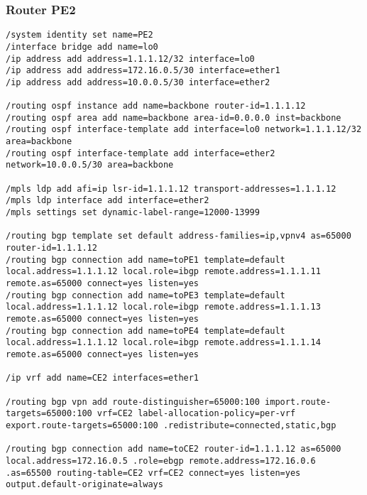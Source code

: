 \subsubsection*{Router PE2}
\begin{lstlisting}[language=RouterOS]
/system identity set name=PE2
/interface bridge add name=lo0
/ip address add address=1.1.1.12/32 interface=lo0
/ip address add address=172.16.0.5/30 interface=ether1
/ip address add address=10.0.0.5/30 interface=ether2

/routing ospf instance add name=backbone router-id=1.1.1.12
/routing ospf area add name=backbone area-id=0.0.0.0 inst=backbone
/routing ospf interface-template add interface=lo0 network=1.1.1.12/32 area=backbone
/routing ospf interface-template add interface=ether2 network=10.0.0.5/30 area=backbone

/mpls ldp add afi=ip lsr-id=1.1.1.12 transport-addresses=1.1.1.12
/mpls ldp interface add interface=ether2
/mpls settings set dynamic-label-range=12000-13999

/routing bgp template set default address-families=ip,vpnv4 as=65000 router-id=1.1.1.12
/routing bgp connection add name=toPE1 template=default local.address=1.1.1.12 local.role=ibgp remote.address=1.1.1.11 remote.as=65000 connect=yes listen=yes
/routing bgp connection add name=toPE3 template=default local.address=1.1.1.12 local.role=ibgp remote.address=1.1.1.13 remote.as=65000 connect=yes listen=yes
/routing bgp connection add name=toPE4 template=default local.address=1.1.1.12 local.role=ibgp remote.address=1.1.1.14 remote.as=65000 connect=yes listen=yes

/ip vrf add name=CE2 interfaces=ether1 

/routing bgp vpn add route-distinguisher=65000:100 import.route-targets=65000:100 vrf=CE2 label-allocation-policy=per-vrf export.route-targets=65000:100 .redistribute=connected,static,bgp

/routing bgp connection add name=toCE2 router-id=1.1.1.12 as=65000 local.address=172.16.0.5 .role=ebgp remote.address=172.16.0.6 .as=65500 routing-table=CE2 vrf=CE2 connect=yes listen=yes output.default-originate=always
\end{lstlisting}

